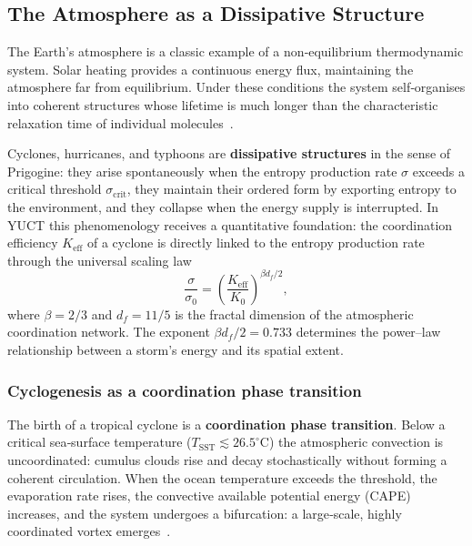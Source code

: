 \documentclass[12pt,a4paper]{article}
\newcommand{\Keff}{K_{\mathrm{eff}}}
\begin{document}
\subsection{The Atmosphere as a Dissipative Structure}
\label{subsec:atmo_diss}

The Earth's atmosphere is a classic example of a non‑equilibrium thermodynamic
system.  Solar heating provides a continuous energy flux, maintaining the
atmosphere far from equilibrium.  Under these conditions the system self‑organises
into coherent structures whose lifetime is much longer than the characteristic
relaxation time of individual molecules~\cite{Prigogine1977}.

Cyclones, hurricanes, and typhoons are \textbf{dissipative structures} in the
sense of Prigogine: they arise spontaneously when the entropy production rate
$\sigma$ exceeds a critical threshold $\sigma_{\mathrm{crit}}$, they maintain
their ordered form by exporting entropy to the environment, and they collapse
when the energy supply is interrupted.  In YUCT this phenomenology receives a
quantitative foundation: the coordination efficiency $\Keff$ of a cyclone is
directly linked to the entropy production rate through the universal scaling law
\begin{equation}
	\frac{\sigma}{\sigma_0} = \left( \frac{\Keff}{K_0} \right)^{\beta d_f / 2},
	\label{eq:cyclone_sigma}
\end{equation}
where $\beta = 2/3$ and $d_f = 11/5$ is the fractal dimension of the atmospheric
coordination network.  The exponent $\beta d_f / 2 = 0.733$ determines the
power–law relationship between a storm's energy and its spatial extent.

\subsubsection*{Cyclogenesis as a coordination phase transition}

The birth of a tropical cyclone is a \textbf{coordination phase transition}.
Below a critical sea‑surface temperature ($T_{\mathrm{SST}} \lesssim 26.5^{\circ}\mathrm{C}$)
the atmospheric convection is uncoordinated: cumulus clouds rise and decay
stochastically without forming a coherent circulation.  When the ocean
temperature exceeds the threshold, the evaporation rate rises, the convective
available potential energy (CAPE) increases, and the system undergoes a
bifurcation: a large‑scale, highly coordinated vortex emerges~\cite{Emanuel2003}.
\end{document}

